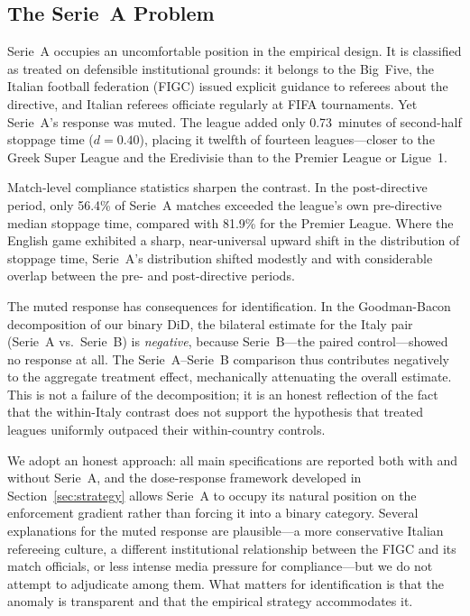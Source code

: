 \subsection{The Serie~A Problem}
\label{sec:background:seriea}

Serie~A occupies an uncomfortable position in the empirical design. It
is classified as treated on defensible institutional grounds: it belongs
to the Big~Five, the Italian football federation (FIGC) issued explicit
guidance to referees about the directive, and Italian referees
officiate regularly at FIFA tournaments. Yet Serie~A's response was
muted. The league added only 0.73~minutes of second-half stoppage time
($d = 0.40$), placing it twelfth of fourteen leagues---closer to the
Greek Super League and the Eredivisie than to the Premier League or
Ligue~1.

Match-level compliance statistics sharpen the contrast. In the
post-directive period, only 56.4\% of Serie~A matches exceeded the
league's own pre-directive median stoppage time, compared with 81.9\%
for the Premier League. Where the English game exhibited a sharp,
near-universal upward shift in the distribution of stoppage time,
Serie~A's distribution shifted modestly and with considerable overlap
between the pre- and post-directive periods.

The muted response has consequences for identification. In the
Goodman-Bacon decomposition of our binary DiD, the bilateral
estimate for the Italy pair (Serie~A vs.\ Serie~B) is \textit{negative},
because Serie~B---the paired control---showed no response at all.
The Serie~A--Serie~B comparison thus contributes negatively to the
aggregate treatment effect, mechanically attenuating the overall
estimate. This is not a failure of the decomposition; it is an honest
reflection of the fact that the within-Italy contrast does not support
the hypothesis that treated leagues uniformly outpaced their
within-country controls.

We adopt an honest approach: all main specifications are reported both
with and without Serie~A, and the dose-response framework developed in
Section~\ref{sec:strategy} allows Serie~A to occupy its natural position
on the enforcement gradient rather than forcing it into a binary
category. Several explanations for the muted response are plausible---a
more conservative Italian refereeing culture, a different institutional
relationship between the FIGC and its match officials, or less intense
media pressure for compliance---but we do not attempt to adjudicate
among them. What matters for identification is that the anomaly is
transparent and that the empirical strategy accommodates it.


